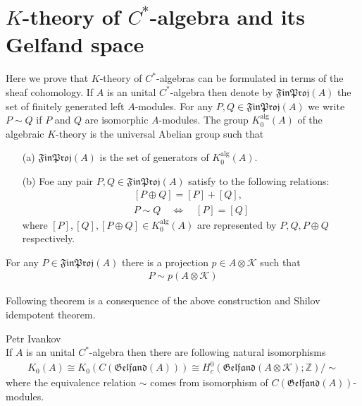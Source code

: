 \documentclass{beamer}
\theoremstyle{plain}
\newcommand{\Z}{\mathbb{Z}}
\newcommand{\bean}{\begin{eqnarray*}}
\newcommand{\eean}{\end{eqnarray*}}
\newcommand{\K}{\mathcal{K}}
\begin{document}
\section{$K$-theory of $C^*$-algebra and its Gelfand space}
\begin{frame}
Here we prove that $K$-theory of $C^*$-algebras can be formulated in terms of the sheaf cohomology. If  $A$ is an unital $C^*$-algebra then denote by $\mathfrak{FinProj}\left( A\right)$ the set of finitely generated left $A$-modules. For any $P, Q \in \mathfrak{FinProj}\left( A\right)$ we write $P \sim Q$ if $P$ and $Q$ are isomorphic $A$-modules. The group  $K^{\mathrm{alg}}_0\left( A\right)$ of the algebraic $K$-theory is the universal Abelian group such that
\begin{enumerate}
	\item[(a)]  $\mathfrak{FinProj}\left( A\right)$ is the set of generators of $K^{\mathrm{alg}}_0\left( A\right)$.
	\item[(b)] Foe any pair $P, Q\in \mathfrak{FinProj}\left( A\right)$ satisfy to the following relations:
	\bean
	\left[P \oplus Q\right] = \left[P\right]+\left[Q\right],\\
	P \sim Q \quad \Leftrightarrow \quad \left[P\right]=\left[Q\right]
	\eean
	where $\left[P\right],\left[Q\right], \left[P \oplus Q\right]\in K^{\mathrm{alg}}_0\left( A\right)$ are represented by $P, Q, P\oplus Q$ respectively.
\end{enumerate}
For any   $P \in \mathfrak{FinProj}\left( A\right)$ there is a projection $p \in A \otimes \K$ such that
\bean
P \sim p\left( A \otimes \K\right) 
\eean 

\end{frame}
\begin{frame}
	Following theorem is a consequence of the above construction and Shilov idempotent theorem.
\begin{theorem}\label{k_0_thm}\alert{Petr Ivankov}\\
	If $A$ is an unital $C^*$-algebra then there are following  natural isomorphisms
	\bean\label{k_00_eqn}
	K_0\left( A\right) \cong K_0\left( C\left( \mathfrak{Gelfand}\left(A \right)\right) \right)\cong  H^0_c\left(\mathfrak{Gelfand}\left( A\otimes \K \right); \Z \right)/\sim
	\eean
	where the equivalence relation $\sim$ comes from isomorphism of $C\left( \mathfrak{Gelfand}\left(A \right)\right)$-modules.	
\end{theorem}
\end{frame}
\end{document}
